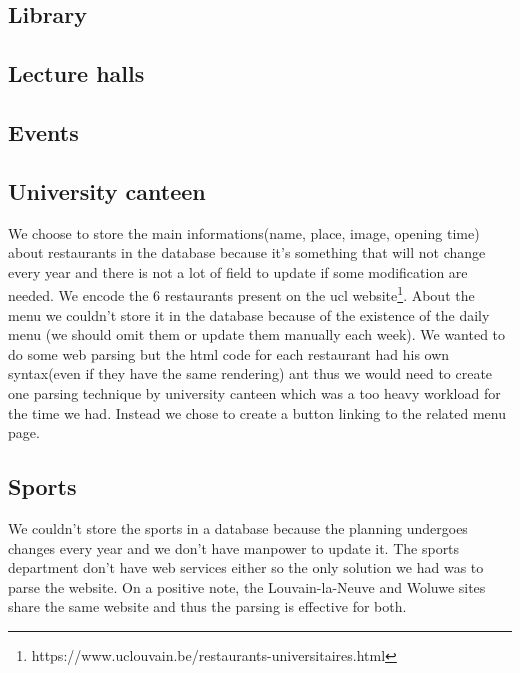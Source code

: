 \documentclass[11pt, a4paper]{report}
\begin{document}
\subsection{Library}
\subsection{Lecture halls}
\subsection{Events}
\subsection{University canteen}
We choose to store the main informations(name, place, image, opening time) about restaurants in the database because it's  something that will not change every year and there is not a lot of field to update if some modification are needed. We encode the 6 restaurants present on the ucl website\footnote{https://www.uclouvain.be/restaurants-universitaires.html}. About the menu we couldn't store it in the database because of the existence of the daily menu (we should omit them or update them manually each week). We wanted to do some web parsing but the html code for each restaurant had his own syntax(even if they have the same rendering) ant thus we would need to create one parsing technique by university canteen which was a too heavy workload for the time we had. Instead we chose to create a button linking to the related menu page.
\subsection{Sports}
We couldn't store the sports in a database because the planning undergoes changes every year and we don't have manpower to update it. The sports department don't have web services either so the only solution we had was to parse the website. On a positive note, the Louvain-la-Neuve and Woluwe sites share the same website and thus the parsing is effective for both. 
\end{document}

